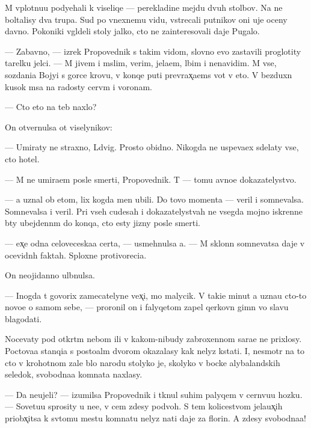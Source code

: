 \documentclass[10pt]{book}
\begin{document}
M{\yi} vplotnu{\y}u podyehali k viseliqe — perekladine mejdu dvuh stolbov. Na ne{\y} boltalisy dva trupa. Sud{\ia} po vnexnemu vidu, vstrecali putnikov oni uje oceny davno. Poko{\y}niki v{\yi}gl{\ia}deli stoly jalko, cto ne za{\y}interesovali daje Pugalo.

— Zabavno, — izrek Propovednik s takim vidom, slovno {\y}evo zastavili proglotity tarelku jelci. — M{\yi} jivem i m{\yi}slim, verim, jela{\y}em, l{\iu}bim i nenavidim. M{\yi} vse, sozdani{\y}a Bojyi s gor{\ia}ce{\y} krov{\y}u, v konqe puti prevrax̨a{\y}ems{\ia} vot v eto. V bezduxn{\yi}{\y} kusok m{\ia}sa na radosty cerv{\ia}m i voronam.

— Cto eto na teb{\ia} naxlo?

On otvernulsa ot viselynikov:

— Umiraty ne straxno, L{\iu}dvig. Prosto obidno. Nikogda ne uspeva{\y}ex sdelaty vse, cto hotel.

— M{\yi} ne umira{\y}em posle smerti, Propovednik. T{\yi} — tomu {\y}avno{\y}e dokazatelystvo.

— {\Y}a uznal ob etom, lix kogda men{\ia} ubili. Do tovo momenta — veril i somnevalsa. Somnevalsa i veril. Pri vseh cudesah i dokazatelystvah ne vsegda mojno iskrenne b{\yi}ty ubejdenn{\yi}m do konqa, cto {\y}esty jizny posle smerti.

— {\Y}ex̨e odna celoveceska{\y}a certa, — usmehnulsa {\y}a. — M{\yi} sklonn{\yi} somnevatsa daje v ocevidn{\yi}h faktah. Sploxn{\yi}{\y}e protivoreci{\y}a.

On neojidanno ul{\yi}bnulsa.

— Inogda t{\yi} govorix zamecatelyn{\yi}{\y}e vex̨i, mo{\y} malycik. V taki{\y}e minut{\yi} {\y}a uzna{\y}u cto-to novo{\y}e o samom sebe, — proronil on i falyqetom zapel qerkovn{\yi}{\y} gimn vo slavu blagodati.



Nocevaty pod otkr{\yi}t{\yi}m nebom ili v kakom-nibudy zabroxennom sara{\y}e ne prixlosy. Poctova{\y}a stanqi{\y}a s posto{\y}al{\yi}m dvorom okazalasy kak nelyz{\ia} kstati. I, nesmotr{\ia} na to cto v krohotnom zale b{\yi}lo narodu stolyko je, skolyko v bocke alybalandskih seledok, svobodna{\y}a komnata naxlasy.

— Da neujeli? — izumilsa Propovednik i tknul suhim palyqem v cern{\ia}vu{\y}u hoz{\ia}{\y}ku. — Sovetu{\y}u sprosity u ne{\y}e, v cem zdesy podvoh. S tem kolicestvom jela{\y}ux̨ih priobx̨itsa k sv{\ia}tomu mestu komnatu nelyz{\ia} na{\y}ti daje za florin. A zdesy svobodna{\y}a!
\end{document}
